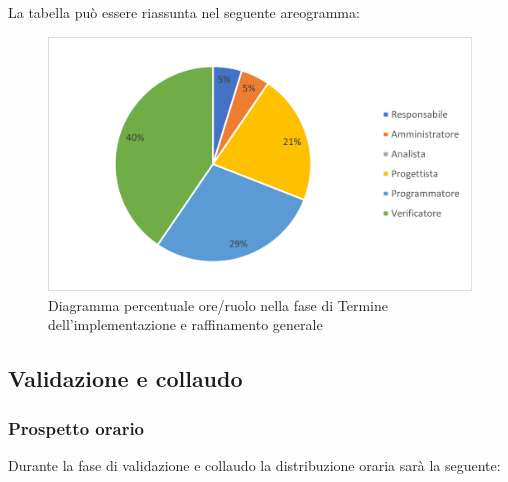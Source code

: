 La tabella può essere riassunta nel seguente areogramma:
\begin{figure}[H]
	\centering
	\includegraphics[width=0.8\linewidth]{res/images/preventivo/6-2.png}
	\caption{Diagramma percentuale ore/ruolo nella fase di Termine dell'implementazione e raffinamento generale}
	\label{fig:diagramma costi ruolo fase Termine dell'implementazione e raffinamento generale}
\end{figure}

\subsection{Validazione e collaudo}
\subsubsection{Prospetto orario}
Durante la fase di validazione e collaudo la distribuzione oraria sarà la seguente:


